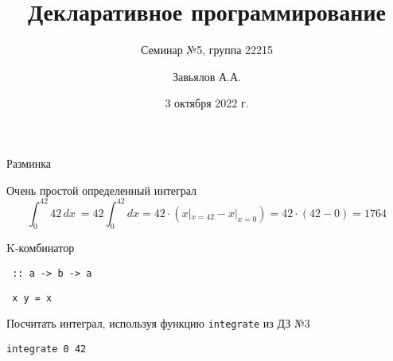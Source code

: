 \documentclass{beamer}
\title{Декларативное программирование}
\subtitle{Семинар №5, группа 22215}
\author{Завьялов А.А.}
\date{3 октября 2022 г.}
\institute{Кафедра систем информатики ФИТ НГУ}
\begin{document}
  \maketitle
  \addtocounter{framenumber}{1}
  \begin{frame}{Разминка}
      \begin{block}{Очень простой определенный интеграл}
      $$ \int_{0}^{42} 42 \,dx\ = 42 \int_{0}^{42} dx = 42 \cdot (x|_{x=42} - x|_{x=0}) = 42 \cdot (42 - 0) = 1764 $$
      \end{block}
      \begin{block}{K-комбинатор}
      
        \texttt{}
      
        \texttt{ :: a -> b -> a}
        
        \texttt{ x y = x}
      \end{block}
      \begin{block}{Посчитать интеграл, используя функцию \texttt{integrate} из ДЗ №3}
        \texttt{}
      
        \texttt{integrate  0 42}
      \end{block}
  \end{frame}
\end{document}
